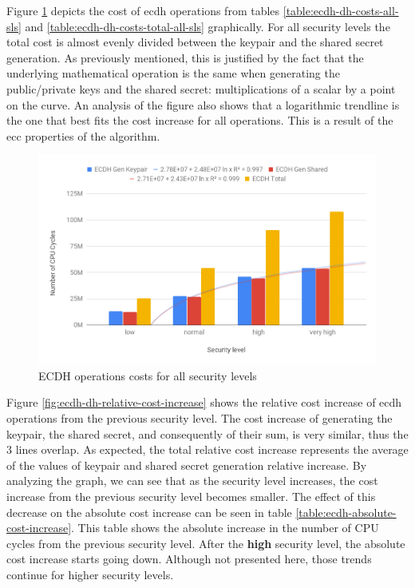 Figure \ref{fig:ecdh-costs-all-sls} depicts the cost of \gls{ecdh} operations from tables \ref{table:ecdh-dh-costs-all-sls} and \ref{table:ecdh-dh-costs-total-all-sls} graphically. 
For all security levels the total cost is almost
evenly divided between the keypair and the shared secret generation. As previously mentioned, this is justified by the fact that the underlying mathematical operation is
the same when generating the public/private keys and the shared secret: multiplications of a scalar by a point on the curve. An analysis of the figure
also shows that a logarithmic trendline is the one that best fits the cost increase for all operations. This is a result of the \gls{ecc} properties of the
algorithm.

\begin{figure}
  \centering
  \includegraphics[width=1.0\textwidth]{img/ecdh_cost_all_sls.png}
  \centering \caption{\label{fig:ecdh-costs-all-sls} ECDH operations costs for all security levels}
\end{figure}

Figure \ref{fig:ecdh-dh-relative-cost-increase} shows the relative cost increase of \gls{ecdh} operations from the previous security level.
The cost increase of generating the keypair, the shared secret, and consequently of their sum, is very similar, thus the $3$ lines overlap.
As expected, the total relative cost increase represents the average of the values of keypair and shared secret generation relative increase.
By analyzing the graph, we can see  that as the security level increases, the cost increase  from the previous security
level becomes smaller. The effect of this decrease on the absolute cost increase can be seen in table \ref{table:ecdh-absolute-cost-increase}.
This table shows the absolute increase in the number of CPU cycles from
the previous security level. After the \textbf{high} security level, the absolute cost increase starts
going down. Although not presented here, those trends continue for higher security levels.

